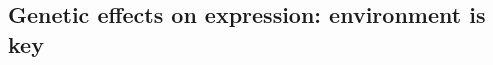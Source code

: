 \begin{outline}
%
%
%


%

\section{Genetic effects on expression: environment is key}


\end{outline}

